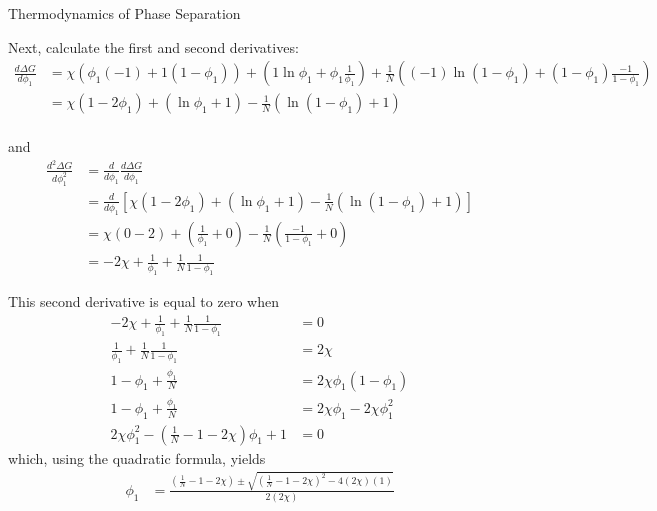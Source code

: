 \begin{activity}{Thermodynamics of Phase Separation}
\begin{exercises}
\begin{solution}{}
				Next, calculate the first and second derivatives:
				\begin{align*}
					\frac{d\Delta G}{d\phi_1} &= \chi\left(\phi_1(-1) + 1(1-\phi_1)\right) + \left(1\ln\phi_1 + \phi_1\frac{1}{\phi_1}\right) + \frac{1}{N}\left((-1)\ln(1-\phi_1) + (1-\phi_1)\frac{-1}{1-\phi_1}\right)\\
						&= \chi\left(1-2\phi_1\right) + \left(\ln\phi_1 + 1\right) - \frac{1}{N}\left(\ln(1-\phi_1) + 1\right)\\
				\end{align*}
				\end{solution}%
				\begin{solution}{}
				and
				\begin{align*}
					\frac{d^2\Delta G}{d\phi_1^2} &= \frac{d}{d\phi_1}\frac{d\Delta G}{d\phi_1}\\
						&= \frac{d}{d\phi_1}\left[\chi\left(1-2\phi_1\right) + \left(\ln\phi_1 + 1\right) - \frac{1}{N}\left(\ln(1-\phi_1) + 1\right)\right]\\
						&= \chi(0 - 2) + \left(\frac{1}{\phi_1} + 0\right) - \frac{1}{N}\left(\frac{-1}{1-\phi_1} + 0\right)\\
						&= -2\chi + \frac{1}{\phi_1} + \frac{1}{N}\frac{1}{1-\phi_1}
				\end{align*}
				
				This second derivative is equal to zero when
				\begin{align*}
					-2\chi + \frac{1}{\phi_1} + \frac{1}{N}\frac{1}{1-\phi_1} &= 0\\
					\frac{1}{\phi_1} + \frac{1}{N}\frac{1}{1-\phi_1} &= 2\chi \\
					1-\phi_1 + \frac{\phi_1}{N} &= 2\chi\phi_1(1-\phi_1) \\
					1-\phi_1 + \frac{\phi_1}{N} &= 2\chi\phi_1-2\chi\phi_1^2 \\
					2\chi\phi_1^2 - \left(\frac{1}{N} - 1 - 2\chi\right)\phi_1 + 1 &= 0
				\end{align*}
				which, using the quadratic formula, yields
				\begin{align*}
					\phi_1 &= \frac{\left(\frac{1}{N} - 1 - 2\chi\right) \pm \sqrt{\left(\frac{1}{N} - 1 - 2\chi\right)^2 - 4(2\chi)(1)}}{2(2\chi)}
				\end{align*}
			\end{solution}
\end{exercises}
	
\end{activity}